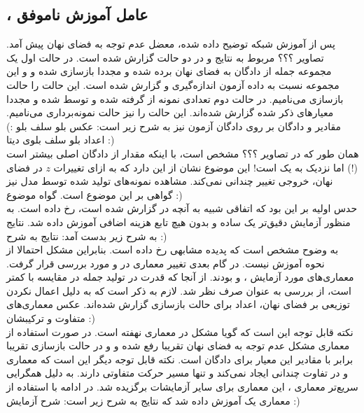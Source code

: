 \subsection{\encoder{}،
عامل آموزش ناموفق}
پس از آموزش شبکه توضیح داده شده، معضل عدم توجه \decoder{} به فضای نهان پیش آمد. تصاویر ؟؟؟ مربوط به نتایج \bleu{} و \selfbleu{} در دو حالت گزارش شده است. در حالت اول یک مجموعه جمله از دادگان 
به فضای نهان برده شده و مجددا بازسازی ‌شده و \bleu{} و \selfbleu{} این مجموعه نسبت به داده آزمون اندازه‌گیری و گزارش شده است. این حالت را حالت بازسازی می‌نامیم. در حالت دوم تعدادی نمونه از \priordist{} گرفته شده و توسط \decoder{}  
\decode{}
شده و مجددا معیارهای ذکر شده گزارش شده‌اند. این حالت را نیز حالت نمونه‌برداری می‌نامیم.
مقادیر \bleu{} و \selfbleu{} دادگان \validation{} بر روی دادگان آزمون نیز به شرح زیر است:
عکس بلو سلف بلو :)
اعداد بلو سلف بلوی دیتا :)
\\
همان طور که در تصاویر ؟؟؟ مشخص است، با اینکه مقدار \bleu{} از دادگان اصلی بیشتر است (!) اما \selfbleu{} نزدیک به یک است! این موضوع نشان از این دارد که به ازای تغییرات $z$ در فضای نهان، خروجی \decoder{} تغییر چندانی نمی‌کند. مشاهده نمونه‌های تولید شده توسط مدل نیز گواهی بر این موضوع است.
گواه موضوع :)
\\
حدس اولیه بر این بود که اتفاقی شبیه به آنچه در \vae{} گزارش شده است، رخ داده است. به منظور آزمایش دقیق‌تر یک \autoencoder{} ساده و بدون هیچ تابع هزینه اضافی آموزش داده شد. نتایج به شرح زیر بدست آمد:
نتایج به شرح :)
\\
به وضوح مشخص است که پدیده مشابهی رخ داده است. بنابراین مشکل احتمالا از نحوه آموزش نیست. در گام بعدی تغییر معماری در \encoder{} و \decoder{} مورد بررسی قرار گرفت. معماری‌های مورد آزمایش ،  و   بودند. از آنجا که قدرت  در تولید جمله در مقایسه با  کمتر است، از بررسی  به عنوان \decoder{} صرف نظر شد. لازم به ذکر است که به دلیل اعمال نکردن توزیعی بر فضای نهان، اعداد برای حالت بازسازی گزارش شده‌اند.
عکس معماری‌های متفاوت و ترکیبشان :)
\\
نکته قابل توجه این است که گویا مشکل در معماری \encoder{} نهفته است. در صورت استفاده از معماری \transformer{} مشکل عدم توجه به فضای نهان تقریبا رفع شده و \bleu{} و \selfbleu{} در حالت بازسازی تقریبا برابر با مقادیر این معیار برای دادگان \validation{} است. نکته قابل توجه دیگر این است که معماری \lstm{} و \transformer{} در \decoder{} تفاوت چندانی ایجاد نمی‌کند و تنها مسیر حرکت متفاوتی دارند.
به دلیل همگرایی سریع‌تر معماری \transformer{}، این معماری برای سایر آزمایشات برگزیده شد. در ادامه با استفاده از معماری \transformer{} یک \wae{} آموزش داده شد که نتایج به شرح زیر است:
شرح آزمایش :)
\\
\fi
